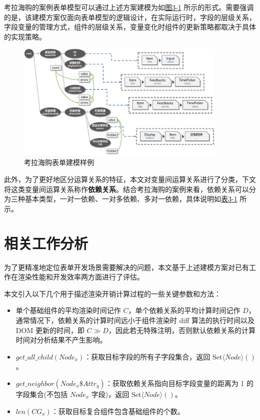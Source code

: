 \documentclass[winfonts,master,twoside]{njuthesis}
\begin{document}
考拉海购的案例表单模型可以通过上述方案建模为如\hyperref[entire-model]{图3-1} 所示的形式。需要强调的是，该建模方案仅面向表单模型的逻辑设计，在实际运行时，字段的层级关系，字段变量的管理方式，组件的层级关系，变量变化时组件的更新策略都取决于具体的实现策略。

\begin{figure}[h]
    \centering
    \includegraphics[width=0.9\textwidth]{figure/chapter-2/entire_model.png}
    \caption{考拉海购表单建模样例}
    \label{entire-model}
\end{figure}

此外，为了更好地区分运算关系的特征，本文对变量间运算关系进行了分类，下文将这类变量间运算关系称作\textbf{依赖关系}。结合考拉海购的案例来看，依赖关系可以分为三种基本类型，一对一依赖、一对多依赖、多对一依赖，具体说明如\hyperref[dependency-situations]{表3-1} 所示。



\section{相关工作分析}\label{related-work-analysis}

为了更精准地定位表单开发场景需要解决的问题，本文基于上述建模方案对已有工作在渲染性能和开发效率两方面进行了评估。

本文引入以下几个用于描述渲染开销计算过程的一些关键参数和方法：

\begin{itemize}
    \item 单个基础组件的平均渲染时间记作 $C$，单个依赖关系的平均计算时间记作 $D$，通常情况下，依赖关系的计算时间远小于组件渲染时 diff 算法的执行时间以及 DOM 更新的时间，即 $C\gg D$，因此若无特殊注明，否则默认依赖关系的计算时间对分析结果不产生影响。
    \item $get\_all\_child(Node_x)$：获取目标字段的所有子字段集合，返回 $\text{Set}\langle Node\rangle()$。
    \item $get\_neighbor(Node_x\$Attr_y)$：获取依赖关系指向目标字段变量的距离为 1 的字段集合(不包括 $Node_x$ 字段)，返回 $\text{Set}\langle Node\rangle()$。
    \item $len(CG_x)$：获取目标复合组件包含基础组件的个数。
\end{itemize}
\end{document}
